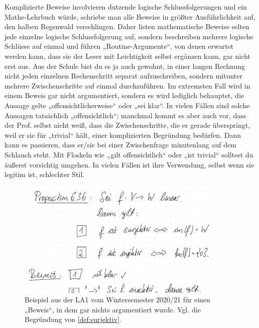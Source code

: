 \begin{bem}
    Komplizierte Beweise involvieren dutzende logische Schlussfolgerungen und ein Mathe-Lehrbuch würde, schriebe man alle Beweise in größter Ausführlichkeit auf, den halben Regenwald verschlingen. Daher listen mathematische Beweise selten jede einzelne logische Schlussfolgerung auf, sondern beschreiben mehrere logische Schlüsse auf einmal und führen „Routine-Argumente“, von denen erwartet werden kann, dass sie der Leser mit Leichtigkeit selbst ergänzen kann, gar nicht erst aus. Aus der Schule bist du es ja auch gewohnt, in einer langen Rechnung nicht jeden einzelnen Rechenschritt separat aufzuschreiben, sondern mitunter mehrere Zwischenschritte auf einmal durchzuführen. Im extremsten Fall wird in einem Beweis gar nicht argumentiert, sondern es wird lediglich behauptet, die Aussage gelte „offensichtlicherweise“ oder „sei klar“. In vielen Fällen sind solche Aussagen tatsächlich „offensichtlich“; manchmal kommt es aber auch vor, dass der Prof. selbst nicht weiß, dass die Zwischenschritte, die er gerade überspringt, weil er sie für „trivial“ hält, einer komplizierten Begründung bedürfen. Dann kann es passieren, dass er/sie bei einer Zwischenfrage minutenlang auf dem Schlauch steht. Mit Floskeln wie „gilt offensichtlich“ oder „ist trivial“ solltest du äußerst vorsichtig umgehen. In vielen Fällen ist ihre Verwendung, selbst wenn sie legitim ist, schlechter Stil.
    \begin{figure}[ht]
        \includegraphics[width=10cm]{./_img/Istklar.jpeg}
        \centering \caption{Beispiel aus der LA1 vom Wintersemester 2020/21 für einen „Beweis“, in dem gar nichts argumentiert wurde. Vgl. die Begründung von \cref{def:surjektiv}.}
    \end{figure}
\end{bem}


